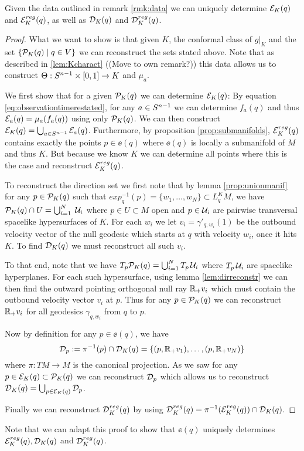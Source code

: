 \begin{proposition}\label{prop:obsreconstr}
    Given the data outlined in remark \ref{rmk:data} we can uniquely determine ${\mathcal{E}}_K(q)$ and ${\mathcal{E}}^{reg}_K(q)$, as well as ${\mathcal{D}}_K(q)$ and ${\mathcal{D}}^{reg}_K(q)$.
\end{proposition}
\begin{proof}
    What we want to show is that given $K$, the conformal class of $g\rvert_{K}$ and the set $\{{{\mathcal{P}}_K(q)} \mid q\in V\}$ we can reconstruct the sets stated above. Note that as described in \ref{lem:Kcharact} ((Move to own remark?)) this data allows us to construct $\Theta:{S^{n-1}} \times [0,1]\to K$ and $\mu_a$.

    We first show that for a given ${\mathcal{P}}_K(q)$ we can determine ${\mathcal{E}}_K(q)$: By equation \ref{eq:observationtimerestated}, for any $a\in {S^{n-1}}$ we can determine $f_a(q)$ and thus ${\mathcal{E}}_a(q)=\mu_a(f_a(q))$ using only ${{\mathcal{P}}_K(q)}$. We can then construct ${\mathcal{E}}_K(q) = \bigcup_{a\in {S^{n-1}}} {\mathcal{E}}_a(q)$. Furthermore, by proposition \ref{prop:submanifolds}, ${{\mathcal{E}}^{reg}_K}(q)$ contains exactly the points $p\in \ee(q)$ where $\ee(q)$ is locally a submanifold of $M$ and thus $K$. But because we know $K$ we can determine all points where this is the case and reconstruct ${{\mathcal{E}}^{reg}_K}(q)$. 

    To reconstruct the direction set we first note that by lemma \ref{prop:unionmanif} for any $p\in {{\mathcal{P}}_K(q)}$ such that $exp_q^{-1}(p)=\{w_1,\dots,w_N\}\subset L^K_qM$, we have ${{\mathcal{P}}_K(q)} \cap U = \bigcup_{i=1}^N\; \mathcal{U}_i$ where $p\in U\subset M$ open and $p\in \mathcal{U}_i$ are pairwise transversal spacelike hypersurfaces of $K$. For each $w_i$ we let $v_i=\gamma'_{q,w_i}(1)$ be the outbound velocity vector of the null geodesic which starts at $q$ with velocity $w_i$, once it hits $K$. To find ${\mathcal{D}}_K(q)$ we must reconstruct all such $v_i$.
    
    To that end, note that we have $T_p{{\mathcal{P}}_K(q)} = \bigcup_{i=1}^N T_p\,\mathcal{U}_i$ where $T_p\,\mathcal{U}_i$ are spacelike hyperplanes. For each such hypersurface, using lemma \ref{lem:dirreconstr} we can then find the outward pointing orthogonal null ray $\mathbb{R}_+v_i$ which must contain the outbound velocity vector $v_i$ at $p$. Thus for any $p\in {{\mathcal{P}}_K(q)}$ we can reconstruct $\mathbb{R}_+v_i$ for all geodesics $\gamma_{q,w_i}$ from $q$ to $p$.

   Now by definition for any $p\in \ee(q)$, we have 
    \[
        {\mathcal{D}}_p := \pi^{-1}(p)\cap {\mathcal{D}}_K(q) = \{(p,\mathbb{R}_+v_1), \dots, (p,\mathbb{R}_+v_N)\}
    \]
    where $\pi:TM\to M$ is the canonical projection. As we saw for any $p\in {{\mathcal{E}}_K}(q)\subset {{\mathcal{P}}_K(q)}$ we can reconstruct ${\mathcal{D}}_p$ which allows us to reconstruct ${\mathcal{D}}_K(q) = \bigcup_{p\in {{\mathcal{E}}_K}(q)} {\mathcal{D}}_p$.

    Finally we can reconstruct ${\mathcal{D}}^{reg}_K(q)$ by using ${\mathcal{D}}^{reg}_K(q)=\pi^{-1}({{\mathcal{E}}^{reg}_K}(q)) \cap {\mathcal{D}}_K(q)$.
\end{proof}
Note that we can adapt this proof to show that $\ee(q)$ uniquely determines ${{\mathcal{E}}^{reg}_K}(q), {\mathcal{D}}_K(q)$ and ${\mathcal{D}}^{reg}_K(q)$.

